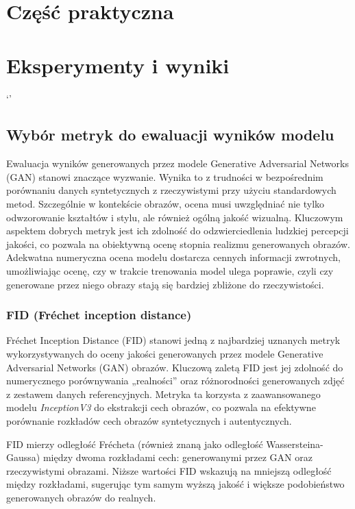 \chapter{Część praktyczna}
    \justify
\chapter{Eksperymenty i wyniki}
	\justify`'
	\section{Wybór metryk do ewaluacji wyników modelu}
        Ewaluacja wyników generowanych przez modele Generative Adversarial Networks (GAN) stanowi znaczące wyzwanie. Wynika to z trudności w bezpośrednim porównaniu danych syntetycznych z rzeczywistymi przy użyciu standardowych metod. Szczególnie w kontekście obrazów, ocena musi uwzględniać nie tylko odwzorowanie kształtów i stylu, ale również ogólną jakość wizualną. Kluczowym aspektem dobrych metryk jest ich zdolność do odzwierciedlenia ludzkiej percepcji jakości, co pozwala na obiektywną ocenę stopnia realizmu generowanych obrazów. Adekwatna numeryczna ocena modelu dostarcza cennych informacji zwrotnych, umożliwiając ocenę, czy w trakcie trenowania model ulega poprawie, czyli czy generowane przez niego obrazy stają się bardziej zbliżone do rzeczywistości.
        \subsection{FID (Fréchet inception distance)}
            Fréchet Inception Distance (FID) stanowi jedną z najbardziej uznanych metryk wykorzystywanych do oceny jakości generowanych przez modele Generative Adversarial Networks (GAN) obrazów\cite{gan-metrics}. Kluczową zaletą FID jest jej zdolność do numerycznego porównywania „realności” oraz różnorodności generowanych zdjęć z zestawem danych referencyjnych. Metryka ta korzysta z zaawansowanego modelu \textit{InceptionV3} do ekstrakcji cech obrazów, co pozwala na efektywne porównanie rozkładów cech obrazów syntetycznych i autentycznych. 

            FID mierzy odległość Frécheta (również znaną jako odległość Wassersteina-Gaussa) między dwoma rozkładami cech: generowanymi przez GAN oraz rzeczywistymi obrazami. Niższe wartości FID wskazują na mniejszą odległość między rozkładami, sugerując tym samym wyższą jakość i większe podobieństwo generowanych obrazów do realnych.

